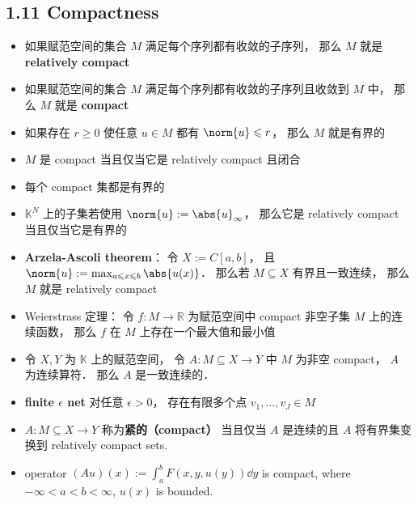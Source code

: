 \subsection{1.11 Compactness}
\begin{itemize}
\item 如果赋范空间的集合 $M$ 满足每个序列都有收敛的子序列， 那么 $M$ 就是 \textbf{relatively compact}

\item 如果赋范空间的集合 $M$ 满足每个序列都有收敛的子序列且收敛到 $M$ 中， 那么 $M$ 就是 \textbf{compact}

\item 如果存在 $r \geqslant 0$ 使任意 $u \in M$ 都有 $\norm{u} \leqslant r$， 那么 $M$ 就是有界的

\item $M$ 是 compact 当且仅当它是 relatively compact 且闭合

\item 每个 compact 集都是有界的

\item $\mathbb K^N$ 上的子集若使用 $\norm{u} := \abs{u}_\infty$， 那么它是 relatively compact 当且仅当它是有界的

\item \textbf{Arzela-Ascoli theorem}： 令 $X := C[a, b]$， 且 $\norm{u} := \max_{a\leqslant x\leqslant b}\abs{u(x)}$． 那么若 $M \subseteq X$ 有界且一致连续， 那么 $M$ 就是 relatively compact

\item Weierstrass 定理： 令 $f: M\to \mathbb R$ 为赋范空间中 compact 非空子集 $M$ 上的连续函数， 那么 $f$ 在 $M$ 上存在一个最大值和最小值

\item 令 $X, Y$ 为 $\mathbb K$ 上的赋范空间， 令 $A: M \subseteq X \to Y$ 中 $M$ 为非空 compact， $A$ 为连续算符． 那么 $A$ 是一致连续的．

\item \textbf{finite $\epsilon$ net} 对任意 $\epsilon > 0$， 存在有限多个点 $v_1, \dots, v_J \in M$ 

\item $A: M \subseteq X \to Y$ 称为\textbf{紧的（compact）} 当且仅当 $A$ 是连续的且 $A$ 将有界集变换到 relatively compact sets.

\item operator $(Au)(x) := \int_a^b F(x, y, u(y)) \dd{y}$ is compact, where $-\infty < a < b < \infty$, $u(x)$ is bounded.
\end{itemize}

